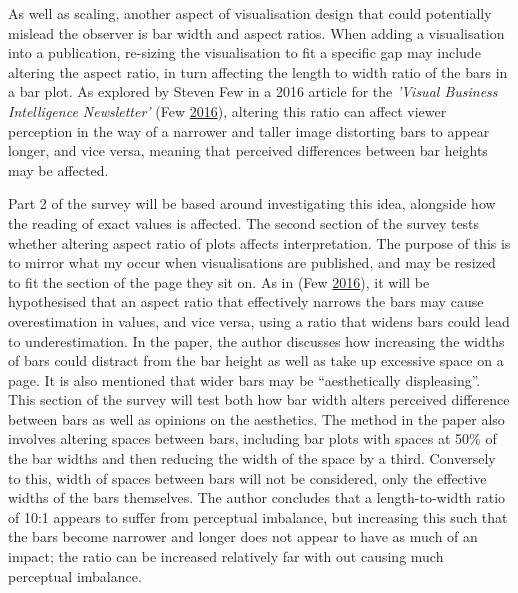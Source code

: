 \documentclass[
  11pt,
]{book}
\begin{document}
As well as scaling, another aspect of visualisation design that could
potentially mislead the observer is bar width and aspect ratios. When
adding a visualisation into a publication, re-sizing the visualisation
to fit a specific gap may include altering the aspect ratio, in turn
affecting the length to width ratio of the bars in a bar plot. As
explored by Steven Few in a 2016 article for the
\textit{'Visual Business Intelligence Newsletter'} (Few
\protect\hyperlink{ref-Few2016}{2016}), altering this ratio can affect
viewer perception in the way of a narrower and taller image distorting
bars to appear longer, and vice versa, meaning that perceived
differences between bar heights may be affected.

Part 2 of the survey will be based around investigating this idea,
alongside how the reading of exact values is affected. The second
section of the survey tests whether altering aspect ratio of plots
affects interpretation. The purpose of this is to mirror what my occur
when visualisations are published, and may be resized to fit the section
of the page they sit on. As in (Few
\protect\hyperlink{ref-Few2016}{2016}), it will be hypothesised that an
aspect ratio that effectively narrows the bars may cause overestimation
in values, and vice versa, using a ratio that widens bars could lead to
underestimation. In the paper, the author discusses how increasing the
widths of bars could distract from the bar height as well as take up
excessive space on a page. It is also mentioned that wider bars may be
``aesthetically displeasing''. This section of the survey will test both
how bar width alters perceived difference between bars as well as
opinions on the aesthetics. The method in the paper also involves
altering spaces between bars, including bar plots with spaces at 50\% of
the bar widths and then reducing the width of the space by a third.
Conversely to this, width of spaces between bars will not be considered,
only the effective widths of the bars themselves. The author concludes
that a length-to-width ratio of 10:1 appears to suffer from perceptual
imbalance, but increasing this such that the bars become narrower and
longer does not appear to have as much of an impact; the ratio can be
increased relatively far with out causing much perceptual imbalance.
\end{document}
